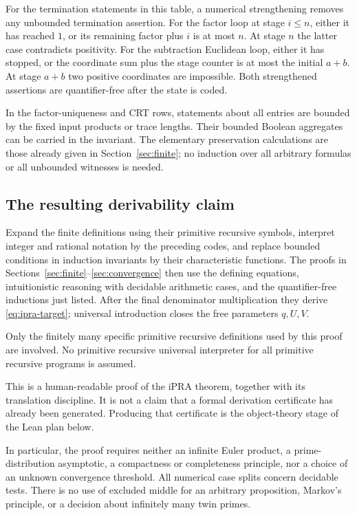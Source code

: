For the termination statements in this table, a numerical strengthening
removes any unbounded termination assertion. For the factor loop at stage
\(i\le n\), either it has reached \(1\), or its remaining factor plus \(i\)
is at most \(n\). At stage \(n\) the latter case contradicts positivity.
For the subtraction Euclidean loop, either it has stopped, or the
coordinate sum plus the stage counter is at most the initial \(a+b\).
At stage \(a+b\) two positive coordinates are impossible.
Both strengthened assertions are quantifier-free after the state is coded.

In the factor-uniqueness and CRT rows, statements about all entries are
bounded by the fixed input products or trace lengths. Their bounded
Boolean aggregates can be carried in the invariant. The elementary
preservation calculations are those already given in
Section~\ref{sec:finite}; no induction over all arbitrary formulas or all
unbounded witnesses is needed.

\subsection{The resulting derivability claim}

Expand the finite definitions using their primitive recursive symbols,
interpret integer and rational notation by the preceding codes, and
replace bounded conditions in induction invariants by their characteristic
functions. The proofs in Sections~\ref{sec:finite}--\ref{sec:convergence}
then use the defining equations, intuitionistic reasoning with decidable
arithmetic cases, and the quantifier-free inductions just listed.
After the final denominator multiplication they derive
\eqref{eq:ipra-target}; universal introduction closes the free parameters
\(q,U,V\).

Only the finitely many specific primitive recursive definitions used by
this proof are involved. No primitive recursive universal interpreter for
all primitive recursive programs is assumed.

This is a human-readable proof of the iPRA theorem, together with its
translation discipline. It is not a claim that a formal derivation
certificate has already been generated. Producing that certificate is
the object-theory stage of the Lean plan below.

In particular, the proof requires neither an infinite Euler product,
a prime-distribution asymptotic, a compactness or completeness principle,
nor a choice of an unknown convergence threshold. All numerical case
splits concern decidable tests. There is no use of excluded middle for an
arbitrary proposition, Markov's principle, or a decision about infinitely
many twin primes.
